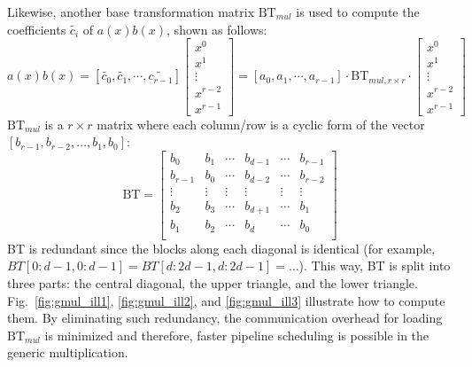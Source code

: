 \documentclass[preprint]{iacrtrans}
\begin{document}
Likewise, another base transformation matrix $\text{BT}_{mul}$ is used to compute the coefficients $\widetilde{c_{i}}$ of $a(x)b(x)$, shown as follows:
\[
a(x)b(x)= [\widetilde{c_{0}},\widetilde{c_{1}},\cdots,\widetilde{c_{r-1}}]\left[ \begin{array}{c}
x^{0} \\
x^{1} \\
\vdots\\
x^{r-2}\\
x^{r-1}
\end{array}
\right ]
=
[{a_{0}},{a_{1}},\cdots,{a_{r-1}}]
\cdot \text{BT}_{mul,r\times r} \cdot
\left[ \begin{array}{c}
x^{0} \\
x^{1} \\
\vdots\\
x^{r-2}\\
x^{r-1}
\end{array}
\right ]
\]
$\text{BT}_{mul}$ is a $r\times r$ matrix where each column/row is a cyclic form of the vector $[b_{r-1},b_{r-2},\ldots, b_{1},b_{0}]$:
\[
\text{BT} =
\left[ \begin{array}{cccccc}
b_{0}&b_{1}&\cdots&b_{d-1}&\cdots &b_{r-1} \\
b_{r-1}&b_{0}&\cdots&b_{d-2}&\cdots &b_{r-2} \\
\vdots&\vdots&\vdots&\vdots&\vdots&\vdots\\
b_{2}&b_{3}&\cdots&b_{d+1}&\cdots &b_{1} \\
b_{1}&b_{2}&\cdots&b_{d}&\cdots &b_{0} \\
\end{array}
\right ]
\]
BT is redundant since the blocks along each diagonal is identical (for example, $BT[0:d-1,0:d-1] = BT[d:2d-1,d:2d-1] = \ldots$). This way, BT is split into three parts: the central diagonal, the upper triangle, and the lower triangle. Fig.~\ref{fig:gmul_ill1}, \ref{fig:gmul_ill2}, and \ref{fig:gmul_ill3} illustrate how to compute them. By eliminating such redundancy, the communication overhead for loading $\text{BT}_{mul}$ is minimized and therefore, faster pipeline scheduling is possible in the generic multiplication.
\end{document}
